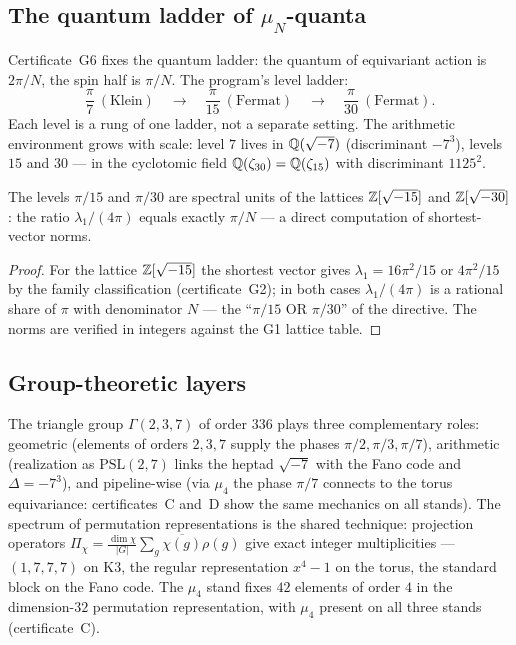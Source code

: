 \subsection{The quantum ladder of $\mu_N$-quanta}

Certificate~G6 fixes the quantum ladder: the quantum of equivariant
action is $2\pi/N$, the spin half is $\pi/N$. The program's level
ladder:
\[
  \frac{\pi}{7}\ (\text{Klein})\quad\longrightarrow\quad
  \frac{\pi}{15}\ (\text{Fermat})\quad\longrightarrow\quad
  \frac{\pi}{30}\ (\text{Fermat}).
\]
Each level is a rung of one ladder, not a separate setting. The
arithmetic environment grows with scale: level $7$ lives in
$\mathbb{Q}(\sqrt{-7})$ (discriminant $-7^3$), levels $15$ and $30$ --- in
the cyclotomic field $\mathbb{Q}(\zeta_{30})=\mathbb{Q}(\zeta_{15})$ with
discriminant $1125^2$.

\begin{proposition}\label{prop:units}
The levels $\pi/15$ and $\pi/30$ are spectral units of the lattices
$\mathbb{Z}[\sqrt{-15}]$ and $\mathbb{Z}[\sqrt{-30}]$: the ratio $\lambda_1/(4\pi)$
equals exactly $\pi/N$ --- a direct computation of shortest-vector
norms.
\end{proposition}

\begin{proof}
For the lattice $\mathbb{Z}[\sqrt{-15}]$ the shortest vector gives
$\lambda_1=16\pi^2/15$ or $4\pi^2/15$ by the family classification
(certificate~G2); in both cases $\lambda_1/(4\pi)$ is a rational
share of $\pi$ with denominator $N$ --- the ``$\pi/15$ OR $\pi/30$''
of the directive. The norms are verified in integers against the G1
lattice table.
\end{proof}

\subsection{Group-theoretic layers}\label{sec:gl32}

The triangle group $\Gamma(2,3,7)$ of order $336$ plays three
complementary roles: geometric (elements of orders $2,3,7$ supply
the phases $\pi/2,\pi/3,\pi/7$), arithmetic (realization as
$\mathrm{PSL}(2,7)$ links the heptad $\sqrt{-7}$ with the Fano code
and $\Delta=-7^3$), and pipeline-wise (via $\mu_4$ the phase
$\pi/7$ connects to the torus equivariance: certificates~C and~D
show the same mechanics on all stands). The spectrum of permutation
representations is the shared technique: projection operators
$\Pi_\chi=\frac{\dim\chi}{|G|}\sum_g\overline{\chi(g)}\rho(g)$ give
exact integer multiplicities --- $(1,7,7,7)$ on K3, the regular
representation $x^4-1$ on the torus, the standard block on the Fano
code. The $\mu_4$ stand fixes $42$ elements of order $4$ in the
dimension-$32$ permutation representation, with $\mu_4$ present on
all three stands (certificate~C).
